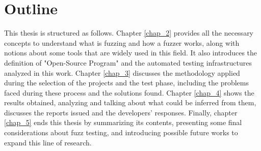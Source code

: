\section{Outline}
This thesis is structured as follows. Chapter \ref{chap_2} provides all the necessary concepts to understand what is fuzzing and how a fuzzer works, along with notions about some tools that are widely used in this field. It also introduces the definition of "Open-Source Program" and the automated testing infrastructures analyzed in this work. Chapter \ref{chap_3} discusses the methodology applied during the selection of the projects and the test phase, including the problems faced during these process and the solutions found. Chapter \ref{chap_4} shows the results obtained, analyzing and talking about what could be inferred from them, discusses the reports issued and the developers' responses. Finally, chapter \ref{chap_5} ends this thesis by summarizing its contents, presenting some final considerations about fuzz testing, and introducing possible future works to expand this line of research.